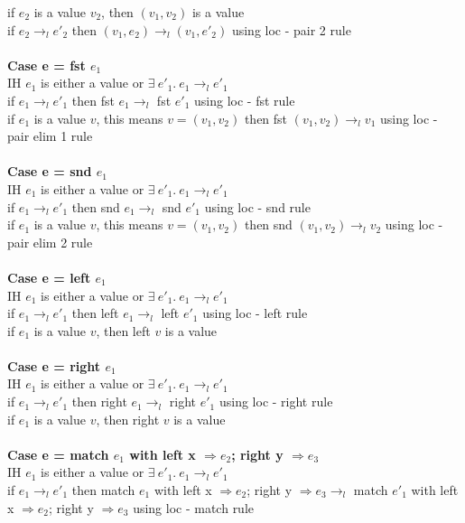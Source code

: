 \documentclass{article}
\begin{document}
if $e_2$ is a value $v_2$, then $(v_1,v_2)$ is a value \\
if $e_2 \to_l e'_2$ then $(v_1,e_2) \to_l (v_1,e'_2)$ using loc - pair 2 rule \\ \\
\textbf{Case e = fst $e_1$} \\
IH $e_1$ is either a value or $  \exists \ e'_1.\ e_1 \to_l e'_1 $ \\
if $e_1 \to_l e'_1$ then fst $e_1 \to_l $ fst $e'_1$ using loc - fst rule\\
if $e_1$ is a value $v$, this means $v = (v_1, v_2)$ then fst $(v_1, v_2) \to_l v_1$ using loc - pair elim 1 rule\\ \\
\textbf{Case e = snd $e_1$} \\
IH $e_1$ is either a value or $  \exists \ e'_1.\ e_1 \to_l e'_1 $ \\
if $e_1 \to_l e'_1$ then snd $e_1 \to_l $ snd $e'_1$ using loc - snd rule\\
if $e_1$ is a value $v$, this means $v = (v_1, v_2)$ then snd $(v_1, v_2) \to_l v_2$ using loc - pair elim 2 rule\\ \\
\textbf{Case e = left $e_1$} \\
IH $e_1$ is either a value or $  \exists \ e'_1.\ e_1 \to_l e'_1 $ \\
if $e_1 \to_l e'_1$ then left $e_1 \to_l$ left $e'_1$ using loc - left rule\\
if $e_1$ is a value $v$, then left $v$ is a value\\ \\
\textbf{Case e = right $e_1$} \\
IH $e_1$ is either a value or $  \exists \ e'_1.\ e_1 \to_l e'_1 $ \\
if $e_1 \to_l e'_1$ then right $e_1 \to_l$ right $e'_1$ using loc - right rule\\
if $e_1$ is a value $v$, then right $v$ is a value\\ \\
\textbf{Case e = match $e_1$ with left x $\Rightarrow e_2$; right y $\Rightarrow e_3$}\\
IH $e_1$ is either a value or $  \exists \ e'_1.\ e_1 \to_l e'_1 $ \\
if $e_1 \to_l e'_1$ then match $e_1$ with left x $\Rightarrow e_2$; right y $\Rightarrow e_3 \to_l$ match $e'_1$ with left x $\Rightarrow e_2$; right y $\Rightarrow e_3$ using loc - match rule\\
\end{document}
